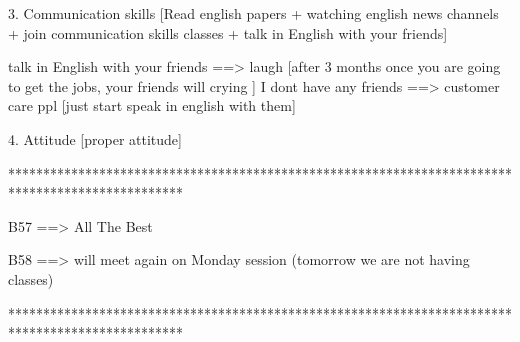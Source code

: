 3. Communication skills [Read english papers + watching english news channels  + join communication skills classes + talk in English with your friends]

talk in English with your friends ==> laugh [after 3 months once you are going to get the jobs, your friends will crying ]
I dont have any friends ==> customer care ppl [just start speak in english with them]

4. Attitude [proper attitude]

*************************************************************************************************

B57 ==> All The Best 

B58 ==> will meet again on Monday session (tomorrow we are not having classes)

*************************************************************************************************
